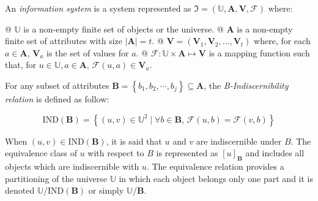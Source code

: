 \documentclass[twocolumn]{svjour3}          \smartqed
\begin{document}
\begin{definition} \label{def:infosys}
An \textit{information system} is a system represented as $\mathfrak{I}=(\mathbb{U},\mathbf{A},\mathbf{V},\mathcal{F} )$ where:
	\begin{easylist}[itemize]
	@ \emph{$\mathbb{U}$} is a non-empty finite set of objects or the universe.
	@ \emph{$\mathbf{A}$} is a non-empty finite set of attributes with size $\vert \mathbf{A} \vert = t$.
	@ \emph{$\mathbf{V} = (\mathbf{V}_1, \mathbf{V}_2, \ldots, \mathbf{V}_t)$} where, for each $a \in \mathbf{A}$, $\mathbf{V}_a$ is the set of values for $a$.
	@ \emph{$\mathcal{F}: \mathbb{U} \times \mathbf{A} \mapsto \mathbf{V}$} is a mapping function such that, for $u \in \mathbb{U}, a \in \mathbf{A}$, $\mathcal{F}(u,a) \in \mathbf{V}_a$.  
	\end{easylist}
\end{definition}



For any subset of attributes $\mathbf{B} = \left\lbrace b_1,b_2,\cdots,b_j \right\rbrace \subseteq \mathbf{A}$, the \textit{B-Indiscernibility relation} is defined as follow:

\begin{equation}\label{ch2:eq:indis}
	\text{IND}(\mathbf{B})=\left\lbrace (u,v) \in \mathbb{U}^2 \mid \forall b \in 	\mathbf{B}, \,\mathcal{F}(u,b)=\mathcal{F}(v,b) \right\rbrace
\end{equation}

When $(u,v) \in \text{IND}(\mathbf{B})$, it is said that $u$ and $v$ are indiscernible under $B$. The equivalence class of $u$ with respect to $B$ is represented as $[u]_{\mathbf{B}}$ and includes all objects which are indiscernible with $u$. The equivalence relation provides a partitioning of the universe $\mathbb{U}$ in which each object belongs only one part and it is denoted $\mathbb{U}/\text{IND}(\mathbf{B})$ or simply $\mathbb{U} / \mathbf{B}$.
\end{document}
